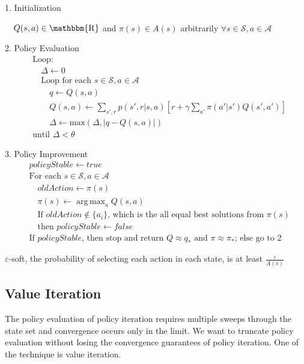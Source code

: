\documentclass[lang=en,mode=geye,device=normal,color=blue,14pt]{elegantnote}
\DeclareMathOperator*{\1}{\mathbbm{1}}
\DeclareMathOperator*{\R}{\mathbbm{R}}
\DeclareMathOperator*{\argmax}{arg\,max}
\begin{document}
\begin{tcolorbox}[width=\textwidth,title={Policy Iteration (using iterative policy evaluation) for estimating $\pi \approx \pi_*$}]
1. Initialization

$\quad Q(s,a) \in\R$ and $\pi(s) \in A(s)$ arbitrarily $\forall s \in \mathcal{S}, a \in \mathcal{A}$

2. Policy Evaluation
\begin{align*}
&\text{Loop:}\\
&\quad\Delta \leftarrow 0\\
&\quad\text{Loop for each } s \in \mathcal{S}, a \in \mathcal{A}\\
&\quad\quad q \leftarrow Q(s,a)\\
&\quad\quad Q(s,a) \leftarrow \sum_{s',r} p(s',r|s,a)[r + \gamma \sum_{a'}\pi(a'|s')Q(s',a')]\\
&\quad\quad \Delta \leftarrow \text{max}(\Delta, |q-Q(s,a)|)\\
&\text{until } \Delta < \theta
\end{align*}

3. Policy Improvement
\begin{align*}
&policyStable \leftarrow true\\
&\text{For each } s \in \mathcal{S}, a \in \mathcal{A}\\
&\quad oldAction \leftarrow \pi(s)\\
&\quad \pi(s) \leftarrow \argmax_a Q(s,a)\\
&\quad \text{If } oldAction \notin \{a_i\} \text{, which is the all equal best solutions from $\pi(s)$}\\
& \quad \text{then } policyStable \leftarrow false\\
&\text{If } policyStable \text{, then stop and return } Q \approx q_* \text{ and } \pi \approx \pi_*\text{; else go to 2}	
\end{align*}
\end{tcolorbox}


\begin{definition}
$\varepsilon$-soft, the probability of selecting each action in each state, is at least $\frac{\varepsilon}{A(s)}$
\end{definition}

\subsection{Value Iteration}

The policy evaluation of policy iteration requires multiple sweeps through the state set and convergence occurs only in the limit.
We want to truncate policy evaluation without losing the convergence guarantees of policy iteration. One of the technique is value iteration.
\end{document}
